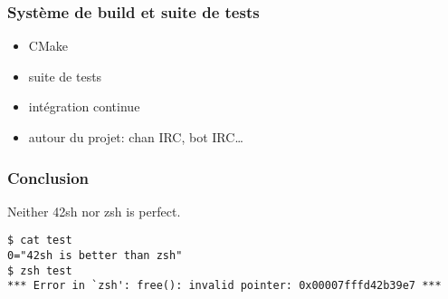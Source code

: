\documentclass{beamer}
\begin{document}
\begin{frame}
    \frametitle{Système de build et suite de tests}
    \begin{itemize}
        \item CMake
        \item suite de tests
        \item intégration continue
        \item autour du projet: chan IRC, bot IRC\ldots
    \end{itemize}
\end{frame}

\begin{frame} [fragile]
    \frametitle{Conclusion}
    Neither 42sh nor zsh is perfect.
\begin{verbatim}
$ cat test
0="42sh is better than zsh"
$ zsh test
*** Error in `zsh': free(): invalid pointer: 0x00007fffd42b39e7 ***
\end{verbatim}
\end{frame}
\end{document}
